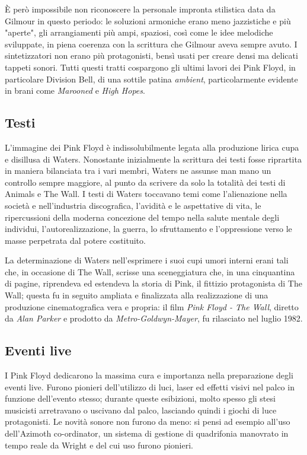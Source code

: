 \documentclass[class=book, crop=false, oneside, 12pt]{standalone}
\begin{document}
    È però impossibile non riconoscere la personale impronta stilistica data da Gilmour in questo periodo: le soluzioni armoniche erano meno jazzistiche e più "aperte", gli arrangiamenti più ampi, spaziosi, così come le idee melodiche sviluppate, in piena coerenza con la scrittura che Gilmour aveva sempre avuto. I sintetizzatori non erano più protagonisti, bensì usati per creare densi ma delicati tappeti sonori. Tutti questi tratti cospargono gli ultimi lavori dei Pink Floyd, in particolare Division Bell, di una sottile patina \emph{ambient}, particolarmente evidente in brani come \emph{Marooned} e \emph{High Hopes}.

    \subsection{Testi}
    L'immagine dei Pink Floyd è indissolubilmente legata alla produzione lirica cupa e disillusa di Waters. Nonostante inizialmente la scrittura dei testi fosse riprartita in maniera bilanciata tra i vari membri, Waters ne assunse man mano un controllo sempre maggiore, al punto da scrivere da solo la totalità dei testi  di Animals e The Wall. I testi di Waters toccavano temi come l'alienazione nella società e nell'industria discografica, l'avidità e le aspettative di vita, le ripercussioni della moderna concezione del tempo nella salute mentale degli individui, l'autorealizzazione, la guerra, lo sfruttamento e l'oppressione verso le masse perpetrata dal potere costituito. 

    La determinazione di Waters nell'esprimere i suoi cupi umori interni erani tali che, in occasione di The Wall, scrisse una sceneggiatura che, in una cinquantina di pagine, riprendeva ed estendeva la storia di Pink, il fittizio protagonista di The Wall; questa fu in seguito ampliata e finalizzata alla realizzazione di una produzione cinematografica vera e propria: il film \emph{Pink Floyd - The Wall}, diretto da \emph{Alan Parker} e prodotto da \emph{Metro-Goldwyn-Mayer}, fu rilasciato nel luglio 1982.

    \subsection{Eventi live}
    I Pink Floyd dedicarono la massima cura e importanza nella preparazione degli eventi live. Furono pionieri dell'utilizzo di luci, laser ed effetti visivi nel palco in funzione dell'evento stesso; durante queste esibizioni, molto spesso gli stesi musicisti arretravano o uscivano dal palco, lasciando quindi i giochi di luce protagonisti. Le novità sonore non furono da meno: si pensi ad esempio all'uso dell'Azimoth co-ordinator, un sistema di gestione di quadrifonia manovrato in tempo reale da Wright e del cui uso furono pionieri.
\end{document}
